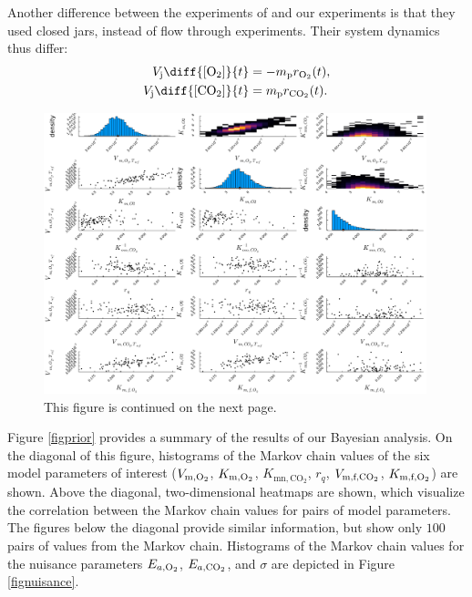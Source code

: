 \\
\\
{\color{red}Another difference between the experiments of \textcite{ho} and our experiments is that they used closed jars, instead of flow through experiments. Their system dynamics thus differ:
	\begin{equation}
		\begin{aligned}
			V_\text{j}\diff{\Coxy}{t} &= - m_\text{p}r_{\oxy}(t),\\
			V_\text{j}\diff{\Ccoxy}{t} &= m_\text{p}r_{\coxy}(t).
		\end{aligned}
		\label{respirationho}
\end{equation}}
\begin{figure}[t!]
	\centering
	\includegraphics[width=0.99\textwidth]{figure/paper 2/test.pdf}
	\captionsetup{labelformat=empty}
	\caption*{\color{red}This figure is continued on the next page.}
\end{figure}
Figure \ref{figprior} provides a summary of the results of our Bayesian analysis. On the diagonal of this figure, histograms of the Markov chain values of the six model parameters of interest ($V_{\text{m},\text{O}_2}$, $K_{\text{m},\text{O}_2}$, $K_{\text{mn},\text{CO}_2}$, $r_q$, $V_{\text{m,f,}\text{CO}_2}$, $K_{\text{m,f},\text{O}_2}$) are shown. Above the diagonal, two-dimensional heatmaps are shown, which visualize the correlation between the Markov chain values for pairs of model parameters. The figures below the diagonal provide similar information, but show only $100$ pairs of values from the Markov chain. Histograms of the Markov chain values for the nuisance parameters $E_{a,\text{O}_2}$, $E_{a,\text{CO}_2}$, and $\sigma$ are depicted in Figure \ref{fignuisance}.
